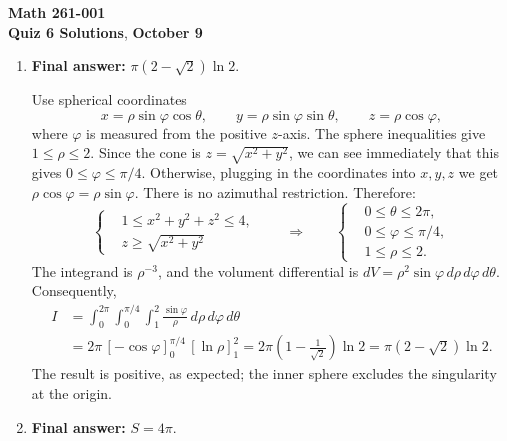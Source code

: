 \documentclass[12pt]{exam}
\newcommand{\class}{Math 261-001}
\newcommand{\examnum}{Quiz 6 Solutions}
\newcommand{\examdate}{October 9}
\begin{document}
\pagestyle{plain}
\thispagestyle{empty}

\noindent
\textbf{\class}\\
\textbf{\examnum}, \textbf{\examdate}

\vspace{8pt}
\small
\setlength{\abovedisplayskip}{6pt}
\setlength{\belowdisplayskip}{6pt}
\setlength{\abovedisplayshortskip}{3pt}
\setlength{\belowdisplayshortskip}{6pt}
\begin{enumerate}

\item \textbf{Final answer:} $\boxed{\pi(2-\sqrt2)\ln2}$.

Use spherical coordinates
\[
  x=\rho\sin\varphi\cos\theta,\qquad
  y=\rho\sin\varphi\sin\theta,\qquad
  z=\rho\cos\varphi,
\]
where $\varphi$ is measured from the positive $z$-axis.
The sphere inequalities give $1\leq\rho\leq2$.
Since the cone is \(z=\sqrt{x^2+y^2}\), we can see immediately that this gives
$0\leq\varphi\leq\pi/4$. Otherwise, plugging in the coordinates into \(x,y,z\) we get \(\rho\cos\varphi=\rho\sin\varphi\). There is no azimuthal restriction.
Therefore:
\[
  \left\{
  \begin{aligned}
    &1\leq x^2+y^2+z^2\leq4,\\
    &z\geq\sqrt{x^2+y^2}
  \end{aligned}
  \right.
  \qquad\Longrightarrow\qquad
  \left\{
  \begin{aligned}
    &0\leq\theta\leq2\pi,\\
    &0\leq\varphi\leq\pi/4,\\
    &1\leq\rho\leq2.
  \end{aligned}
  \right.
\]
The integrand is $\rho^{-3}$, and the volument differential is
$dV=\rho^2\sin\varphi\,d\rho\,d\varphi\,d\theta$.
Consequently,
\[
\begin{aligned}
  I&=\int_0^{2\pi}\int_0^{\pi/4}\int_1^2
      \frac{\sin\varphi}{\rho}\,d\rho\,d\varphi\,d\theta\\
   &=2\pi\,[{-\cos\varphi}]_0^{\pi/4}\,[\ln\rho]_1^2
     =2\pi\left(1-\frac1{\sqrt2}\right)\ln2
     =\pi(2-\sqrt2)\ln2.
\end{aligned}
\]
The result is positive, as expected; the inner sphere excludes the
singularity at the origin.

\medskip
\item \textbf{Final answer:} $\boxed{S=4\pi}$.


\end{enumerate}
\end{document}
